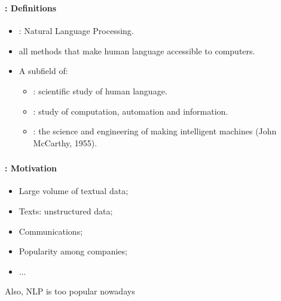 \documentclass[xcolor=table]{beamer}
\subtitle[01- Introduction]{Chapter 01\\Introduction to NLP}
\begin{document}
	
\begin{frame}
	\frametitle{\inserttitle}
	\framesubtitle{\insertshortsubtitle: Definitions}
	
	\begin{itemize}
		\item {}: Natural Language Processing.
		\item all methods that make human language accessible to computers.
	\end{itemize}
	\begin{minipage}{0.78\textwidth}
		\begin{itemize}
			\item A subfield of:
			\begin{itemize}
				\item {}: scientific study of human language.
				\item {}: study of computation, automation and information.
				\item {}: the science and engineering of
				making intelligent machines (John McCarthy, 1955).
			\end{itemize}
		\end{itemize}
	\end{minipage}
	\begin{minipage}{0.20\textwidth}
	\end{minipage}

\end{frame}

\begin{frame}
	\frametitle{\inserttitle}
	\framesubtitle{\insertshortsubtitle: Motivation}
	
	\begin{itemize}
		\item Large volume of textual data;
		
		\item Texts: unstructured data;
		
		\item Communications;
		
		\item Popularity among companies;
		
		\item ...
	\end{itemize}
	
	\begin{center}
		{\Large Also, NLP is too popular nowadays}
	\end{center}

\end{frame}
\end{document}
